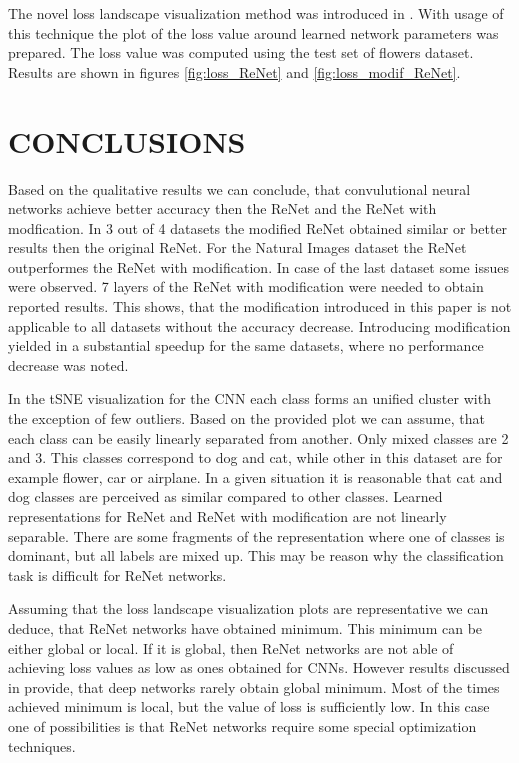 \documentclass[a4paper, 10 pt, journal]{ieeeconf}
\begin{document}
The novel loss landscape visualization method was introduced in \cite{DBLP:journals/corr/abs-1712-09913}. With usage of this technique the plot of the loss value around learned network parameters was prepared. The loss value was computed using the test set of flowers dataset. Results are shown in figures \ref{fig:loss_ReNet} and \ref{fig:loss_modif_ReNet}.

\section{CONCLUSIONS}

Based on the qualitative results we can conclude, that convulutional neural networks achieve better accuracy then the ReNet and the ReNet with modfication. In 3 out of 4 datasets the modified ReNet obtained similar or better results then the original ReNet. For the Natural Images dataset the ReNet outperformes the ReNet with modification. In case of the last dataset some issues were observed. 7 layers of the ReNet with modification were needed to obtain reported results. This shows, that the modification introduced in this paper is not applicable to all datasets without the accuracy decrease. Introducing modification yielded in a substantial speedup for the same datasets, where no performance decrease was noted.

In the tSNE visualization for the CNN each class forms an unified cluster with the exception of few outliers. Based on the provided plot we can assume, that each class can be easily linearly separated from another. Only mixed classes are 2 and 3. This classes correspond to dog and cat, while other in this dataset are for example flower, car or airplane. In a given situation it is reasonable that cat and dog classes are perceived as similar compared to other classes. Learned representations for ReNet and ReNet with modification are not linearly separable. There are some fragments of the representation where one of classes is dominant, but all labels are mixed up. This may be reason why the classification task is difficult for ReNet networks.

Assuming that the loss landscape visualization plots are representative we can deduce, that ReNet networks have obtained minimum. This minimum can be either global or local. If it is global, then ReNet networks are not able of achieving loss values as low as ones obtained for CNNs. However results discussed in \cite{Goodfellow-et-al-2016} provide, that deep networks rarely obtain global minimum. Most of the times achieved minimum is local, but the value of loss is sufficiently low. In this case one of possibilities is that ReNet networks require some special optimization techniques.
\end{document}
